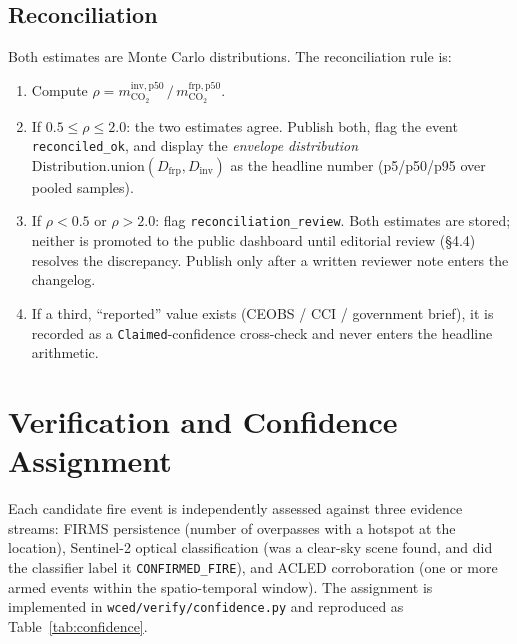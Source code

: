 \documentclass[11pt]{article}
\begin{document}
\subsection{Reconciliation}
\label{sec:reconcile}

Both estimates are Monte Carlo distributions. The reconciliation rule is:

\begin{enumerate}
\item Compute $\rho = m_{\mathrm{CO_2}}^{\mathrm{inv,p50}} \,/\,
  m_{\mathrm{CO_2}}^{\mathrm{frp,p50}}$.
\item If $0.5 \le \rho \le 2.0$: the two estimates agree. Publish both,
  flag the event \texttt{reconciled\_ok}, and display the
  \emph{envelope distribution}
  $\mathrm{Distribution.union}(D_{\mathrm{frp}}, D_{\mathrm{inv}})$
  as the headline number (p5/p50/p95 over pooled samples).
\item If $\rho < 0.5$ or $\rho > 2.0$: flag \texttt{reconciliation\_review}.
  Both estimates are stored; neither is promoted to the public dashboard
  until editorial review (\S4.4) resolves the discrepancy. Publish only
  after a written reviewer note enters the changelog.
\item If a third, ``reported'' value exists (CEOBS / CCI / government
  brief), it is recorded as a \texttt{Claimed}-confidence cross-check and
  never enters the headline arithmetic.
\end{enumerate}

\section{Verification and Confidence Assignment}
\label{sec:verify}

Each candidate fire event is independently assessed against three evidence
streams: FIRMS persistence (number of overpasses with a hotspot at the
location), Sentinel-2 optical classification (was a clear-sky scene found,
and did the classifier label it \texttt{CONFIRMED\_FIRE}), and ACLED
corroboration (one or more armed events within the spatio-temporal window).
The assignment is implemented in \texttt{wced/verify/confidence.py} and
reproduced as Table~\ref{tab:confidence}.
\end{document}
